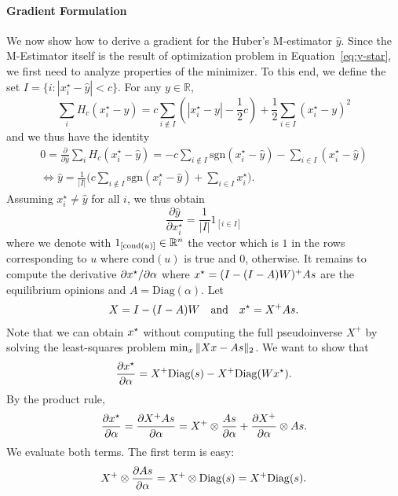 \paragraph{Gradient Formulation}
We now show how to derive a gradient
for the Huber's M-estimator $\hat y$.
Since the M-Estimator itself is the
result of optimization problem in
Equation~\ref{eq:y-star},
we first need to analyze properties
of the minimizer.
To this end,
we define the set
$I = \{i : |x^\star_i - \hat y| < c\}$.
For any $y \in \mathbb R$,
\[
    \sum_{i} H_c(x^\star_{i} - y) =
    c \sum_{i \notin I} \left(|x^\star_i - y| - \frac 1 2 c\right)
    + \frac 1 2 \sum_{i \in I} (x^\star_i - y)^2
\]
and we thus have the identity
\begin{multline*}
    0 = \frac{\partial}{\partial \hat y} \sum_i H_c(x^\star_i - \hat y)
    = -c \sum_{i \notin I} \mathrm{sgn}(x^\star_i - \hat y)
    - \sum_{i \in I} (x^\star_i - \hat y) \\
    \iff
    \hat y = \frac 1 {|I|} \Big(
      c \sum_{i \notin I} \mathrm{sgn}(x^\star_i - \hat y) +
      \sum_{i \in I} x^\star_i \Big) .
\end{multline*}
Assuming $x^\star_i \not= \hat y$ for all $i$, we thus obtain
\[
    \frac{\partial \hat y}{\partial x^\star_i} =
    \frac 1 {|I|} 1_{[i \in I]}
\]
where we denote with $1_{[\mathrm{cond}(u)]} \in \mathbb{R}^n$
the vector which is $1$ in the rows corresponding
to $u$ where $\mathrm{cond}(u)$ is true and $0$, otherwise.
%
It remains to compute the derivative          \def\transMatrix{W}
$ \partial x^\star / \partial \alpha $
where $\bx^\star = (I - (I - A) \transMatrix)^+ A \bs$ are the equilibrium opinions and
$A = \mathrm{Diag}(\alpha)$.
Let
\begin{align*}
    X =
    I - (I - A) \transMatrix
    \quad\textrm{and}\quad
    \bx^\star =
    X^+ A \bs .
\end{align*}
Note that we can obtain $x^\star$ without
computing the full pseudoinverse $X^+$
by solving the least-squares problem
$\min_x \| X x - A s \|_2$.
We want to show that
\[
    \frac{\partial \bx^\star}{\partial \alpha} =
    X^+ \mathrm{Diag}(\bs) - X^+ \mathrm{Diag}(\transMatrix \bx^\star) .
\]
By the product rule,
\[
    \frac{\partial x^\star}{\partial \alpha} =
    \frac{\partial X^+ A s}{\partial \alpha} =
    X^+ \otimes \frac{A s}{\partial \alpha} +
    \frac{\partial X^+}{\partial \alpha} \otimes A s .
\]
We evaluate both terms. The first term is easy:
\[
    X^+ \otimes \frac{\partial A s}{\partial \alpha} =
    X^+ \otimes \mathrm{Diag}(s) =
    X^+ \mathrm{Diag}(s) .
\]
